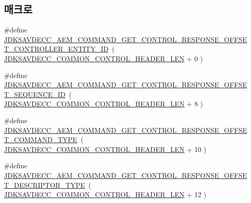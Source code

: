 \subsection*{매크로}
\begin{DoxyCompactItemize}
\item 
\#define \hyperlink{group__command__get__control__response_ga2ccc41cefc73cf43693919bcc94f5a1d}{J\+D\+K\+S\+A\+V\+D\+E\+C\+C\+\_\+\+A\+E\+M\+\_\+\+C\+O\+M\+M\+A\+N\+D\+\_\+\+G\+E\+T\+\_\+\+C\+O\+N\+T\+R\+O\+L\+\_\+\+R\+E\+S\+P\+O\+N\+S\+E\+\_\+\+O\+F\+F\+S\+E\+T\+\_\+\+C\+O\+N\+T\+R\+O\+L\+L\+E\+R\+\_\+\+E\+N\+T\+I\+T\+Y\+\_\+\+ID}~( \hyperlink{group__jdksavdecc__avtp__common__control__header_gaae84052886fb1bb42f3bc5f85b741dff}{J\+D\+K\+S\+A\+V\+D\+E\+C\+C\+\_\+\+C\+O\+M\+M\+O\+N\+\_\+\+C\+O\+N\+T\+R\+O\+L\+\_\+\+H\+E\+A\+D\+E\+R\+\_\+\+L\+EN} + 0 )
\item 
\#define \hyperlink{group__command__get__control__response_ga2e69607f8748db910c9f9223ea2ecc6b}{J\+D\+K\+S\+A\+V\+D\+E\+C\+C\+\_\+\+A\+E\+M\+\_\+\+C\+O\+M\+M\+A\+N\+D\+\_\+\+G\+E\+T\+\_\+\+C\+O\+N\+T\+R\+O\+L\+\_\+\+R\+E\+S\+P\+O\+N\+S\+E\+\_\+\+O\+F\+F\+S\+E\+T\+\_\+\+S\+E\+Q\+U\+E\+N\+C\+E\+\_\+\+ID}~( \hyperlink{group__jdksavdecc__avtp__common__control__header_gaae84052886fb1bb42f3bc5f85b741dff}{J\+D\+K\+S\+A\+V\+D\+E\+C\+C\+\_\+\+C\+O\+M\+M\+O\+N\+\_\+\+C\+O\+N\+T\+R\+O\+L\+\_\+\+H\+E\+A\+D\+E\+R\+\_\+\+L\+EN} + 8 )
\item 
\#define \hyperlink{group__command__get__control__response_gafcd3c297586300d3604680d2d3ce7a78}{J\+D\+K\+S\+A\+V\+D\+E\+C\+C\+\_\+\+A\+E\+M\+\_\+\+C\+O\+M\+M\+A\+N\+D\+\_\+\+G\+E\+T\+\_\+\+C\+O\+N\+T\+R\+O\+L\+\_\+\+R\+E\+S\+P\+O\+N\+S\+E\+\_\+\+O\+F\+F\+S\+E\+T\+\_\+\+C\+O\+M\+M\+A\+N\+D\+\_\+\+T\+Y\+PE}~( \hyperlink{group__jdksavdecc__avtp__common__control__header_gaae84052886fb1bb42f3bc5f85b741dff}{J\+D\+K\+S\+A\+V\+D\+E\+C\+C\+\_\+\+C\+O\+M\+M\+O\+N\+\_\+\+C\+O\+N\+T\+R\+O\+L\+\_\+\+H\+E\+A\+D\+E\+R\+\_\+\+L\+EN} + 10 )
\item 
\#define \hyperlink{group__command__get__control__response_ga6d10660f116852b06ee354529f156954}{J\+D\+K\+S\+A\+V\+D\+E\+C\+C\+\_\+\+A\+E\+M\+\_\+\+C\+O\+M\+M\+A\+N\+D\+\_\+\+G\+E\+T\+\_\+\+C\+O\+N\+T\+R\+O\+L\+\_\+\+R\+E\+S\+P\+O\+N\+S\+E\+\_\+\+O\+F\+F\+S\+E\+T\+\_\+\+D\+E\+S\+C\+R\+I\+P\+T\+O\+R\+\_\+\+T\+Y\+PE}~( \hyperlink{group__jdksavdecc__avtp__common__control__header_gaae84052886fb1bb42f3bc5f85b741dff}{J\+D\+K\+S\+A\+V\+D\+E\+C\+C\+\_\+\+C\+O\+M\+M\+O\+N\+\_\+\+C\+O\+N\+T\+R\+O\+L\+\_\+\+H\+E\+A\+D\+E\+R\+\_\+\+L\+EN} + 12 )
\item 

\end{DoxyCompactItemize}
